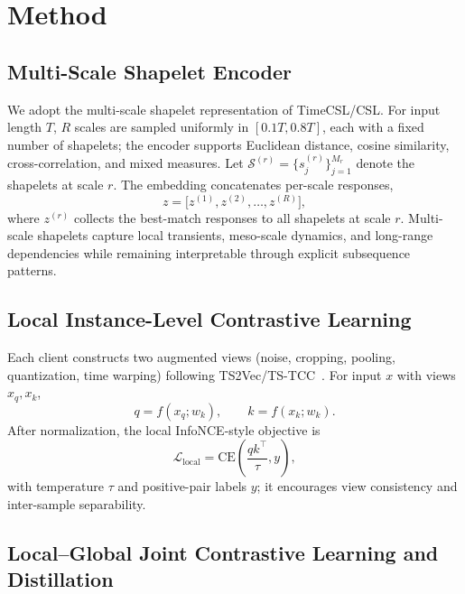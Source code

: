 \documentclass[sigconf]{acmart}
\begin{document}
\section{Method}

\subsection{Multi-Scale Shapelet Encoder}

We adopt the multi-scale shapelet representation of TimeCSL/CSL. For input
length $T$, $R$ scales are sampled uniformly in $[0.1T,0.8T]$, each with a fixed
number of shapelets; the encoder supports Euclidean distance, cosine similarity,
cross-correlation, and mixed measures. Let
$\mathcal{S}^{(r)}=\{s^{(r)}_{j}\}_{j=1}^{M_r}$ denote the shapelets at scale $r$.
The embedding concatenates per-scale responses,
\begin{equation}
z = \bigl[z^{(1)},z^{(2)},\dots,z^{(R)}\bigr],
\end{equation}
where $z^{(r)}$ collects the best-match responses to all shapelets at scale $r$.
Multi-scale shapelets capture local transients, meso-scale dynamics, and
long-range dependencies while remaining interpretable through explicit
subsequence patterns.

\subsection{Local Instance-Level Contrastive Learning}
\label{sec:local-cl}

Each client constructs two augmented views (noise, cropping, pooling,
quantization, time warping) following TS2Vec/TS-TCC~\cite{ts2vec,tstcc}. For
input $x$ with views $x_q,x_k$,
\begin{equation}
q = f(x_q;w_k),\qquad k = f(x_k;w_k).
\end{equation}
After normalization, the local InfoNCE-style objective is
\begin{equation}
\mathcal{L}_{\text{local}} = \mathrm{CE}\!\left(\frac{qk^\top}{\tau}, y\right),
\end{equation}
with temperature $\tau$ and positive-pair labels $y$; it encourages view
consistency and inter-sample separability.

\subsection{Local--Global Joint Contrastive Learning and Distillation}
\label{sec:joint-clkd}
\end{document}
